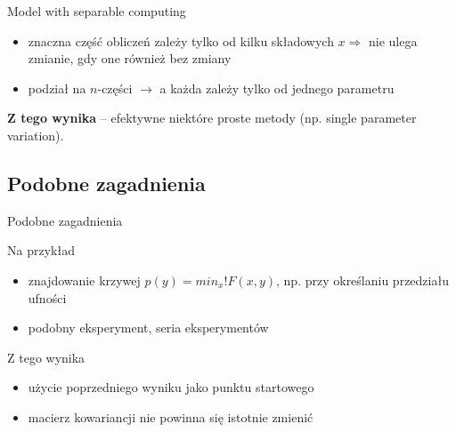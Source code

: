   \begin{frame}{Model with separable computing}
    \begin{itemize}
      \item znaczna część obliczeń zależy tylko od kilku
      składowych $x \Rightarrow$ nie ulega zmianie, gdy
      one również bez zmiany
      \item podział na $n$-części $\to$ a każda zależy tylko
      od jednego parametru
    \end{itemize}
    \textbf{Z tego wynika} -- efektywne niektóre proste
    metody (np. single parameter variation).
  \end{frame}

\subsection{Podobne zagadnienia}

  \begin{frame}{Podobne zagadnienia}
    \begin{exampleblock}{Na przykład}
      \begin{itemize}
        \item znajdowanie krzywej $p(y)=min_{x}!F(x,y)$,
        np. przy określaniu przedziału ufności
        \item podobny eksperyment, seria eksperymentów
      \end{itemize}
    \end{exampleblock}
    \begin{block}{Z tego wynika}
      \begin{itemize}
        \item użycie poprzedniego wyniku jako punktu startowego
        \item macierz kowariancji nie powinna się istotnie zmienić
      \end{itemize}
    \end{block}
  \end{frame}

